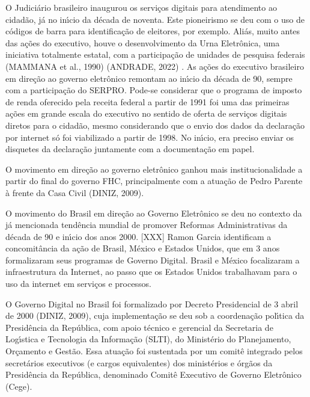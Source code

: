 \documentclass[
12pt,		%
openright,	%
twoside,  %
a4paper,			%
chapter=TITLE,		%
english,			%
french,				%
spanish,			%
brazil				%
]{USPSC-classe/USPSC}
\begin{document}
O Judici\'ario brasileiro inaugurou os servi\c{c}os digitais para atendimento ao cidad\~ao, j\'a no in\'{\i}cio da d\'ecada de noventa. Este pioneirismo se deu com o uso de c\'odigos de barra para identifica\c{c}\~ao de eleitores, por exemplo. Ali\'as, muito antes das a\c{c}\~oes do executivo, houve o desenvolvimento da Urna Eletr\^onica, uma iniciativa totalmente estatal, com a participa\c{c}\~ao de unidades de pesquisa federais  (MAMMANA et al., 1990)  (ANDRADE, 2022) . As a\c{c}\~oes do executivo brasileiro em dire\c{c}\~ao ao governo eletr\^onico remontam ao in\'{\i}cio da d\'ecada de 90, sempre com a participa\c{c}\~ao do SERPRO. Pode-se considerar que o programa de imposto de renda oferecido pela receita federal a partir de 1991 foi uma das primeiras a\c{c}\~oes em grande escala do executivo no sentido de oferta de servi\c{c}os digitais diretos para o cidad\~ao, mesmo considerando que o envio dos dados da declara\c{c}\~ao por internet s\'o foi viabilizado a partir de 1998. No in\'{\i}cio, era preciso enviar os disquetes da declara\c{c}\~ao juntamente com a documenta\c{c}\~ao em papel.









O movimento em dire\c{c}\~ao ao governo eletr\^onico ganhou mais institucionalidade a partir do final do governo FHC, principalmente com a atua\c{c}\~ao de Pedro Parente \`a frente da Casa Civil  (DINIZ, 2009).









O movimento do Brasil em dire\c{c}\~ao ao Governo Eletr\^onico se deu no contexto da j\'a mencionada tend\^encia mundial de promover Reformas Administrativas da d\'ecada de 90 e in\'{\i}cio dos anos 2000. [XXX] Ramon Garcia identificam a concomit\^ancia da a\c{c}\~ao de Brasil, M\'exico e Estados Unidos, que em 3 anos formalizaram seus programas de Governo Digital. Brasil e M\'exico focalizaram a infraestrutura da Internet, ao passo que os Estados Unidos trabalhavam para o uso da internet em servi\c{c}os e processos.









O Governo Digital no Brasil foi formalizado por Decreto Presidencial de 3 abril de 2000  (DINIZ, 2009), cuja implementa\c{c}\~ao se deu sob a coordena\c{c}\~ao pol\'{\i}tica da Presid\^encia da Rep\'ublica, com apoio t\'ecnico e gerencial da Secretaria de Log\'{\i}stica e Tecnologia da Informa\c{c}\~ao (SLTI), do Minist\'erio do Planejamento, Or\c{c}amento e Gest\~ao. Essa atua\c{c}\~ao foi sustentada por um comit\^e integrado pelos secret\'arios executivos (e cargos equivalentes) dos minist\'erios e \'org\~aos da Presid\^encia da Rep\'ublica, denominado Comit\^e Executivo de Governo Eletr\^onico (Cege).
\end{document}
